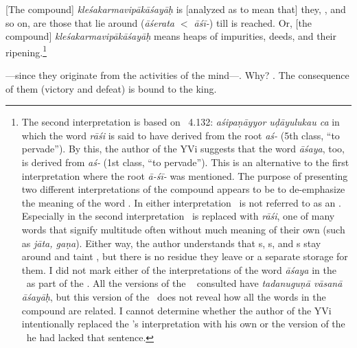 [The compound] \emph{kleśa\-karma\-vipākā\-śayāḥ\/} is [analyzed as to mean that] they, , and so on, are those that lie around (\emph{āśerata $<$ āśī-}) till \nirvana{} is reached.  Or, [the compound] \emph{kleśa\-karma\-vipākā\-śayāḥ\/} means heaps of impurities, deeds, and their ripening.\footnote{\label{ASAYASxvt}The second interpretation is based on \Unadisutra\ 4.132: \emph{aśipaṇāyyor uḍāyulukau ca} in which the word \emph{rāśi} is said to have derived from the root \emph{aś-} (5th class, ``to pervade'').  By this, the author of the YVi suggests that the word \emph{āśaya}, too, is derived from \emph{aś-} (1st class, ``to pervade'').  This is an alternative to the first interpretation where the root \emph{ā-śī-} was mentioned.  The purpose of presenting two different interpretations of the compound appears to be to de-emphasize the meaning of the word \asaya.  In either interpretation \asaya\ is not referred to as an .  Especially in the second interpretation \asaya\ is replaced with \emph{rāśi}, one of many words that signify multitude often without much meaning of their own (such as \emph{jāta, gaṇa}).  Either way, the author understands that \klesa\/s, \karman\/s, and \vipaka\/s stay around and taint \purusa, but there is no residue they leave or a separate storage for them. I did not mark either of the interpretations of the word \emph{āśaya} in the \sutra\ as part of the \bhasya.  All the versions of the \YBh\ \citet{maas:2006} consulted have \emph{tadanuguṇā vāsanā āśayāḥ}, but this version of the \bhasya\ does not reveal how all the words in the compound are related.  I cannot determine whether the author of the YVi intentionally replaced the \bhasya's interpretation with his own or the version of the \bhasya\ he had lacked that sentence.}

---since they originate from the activities of the mind---.  Why?    .  The consequence of them (victory and defeat) is bound to the king.

